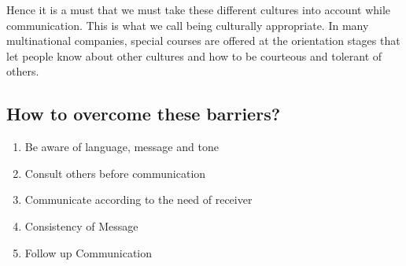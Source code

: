 \documentclass[11pt]{article}
\begin{document}
Hence it is a must that we must take these different cultures into account while communication. This is what we call being culturally appropriate. In many multinational companies, special courses are offered at the orientation stages that let people know about other cultures and how to be courteous and tolerant of others.

\subsection{How to overcome these barriers?}
\begin{enumerate}
	\item Be aware of language, message and tone
	\item Consult others before communication
	\item Communicate according to the need of receiver
	\item Consistency of Message
	\item Follow up Communication
\end{enumerate}
\end{document}

